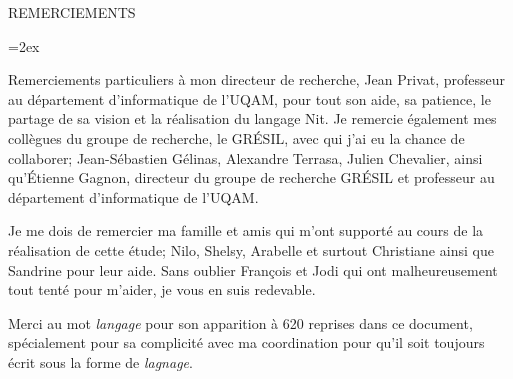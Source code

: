 
   \parskip=0pt
   \vspace*{0.1 truecm} 
   \begin{center}
    {\uppercase { REMERCIEMENTS }}\par
   \end{center}
   \nobreak \vspace*{1.10 truecm}
   \parskip=2ex

Remerciements particuliers à mon directeur de recherche, Jean Privat,  professeur au département d'informatique de l'UQAM, pour tout son aide, sa patience, le partage de sa vision et la réalisation du langage Nit. Je remercie également mes collègues du groupe de recherche, le GRÉSIL, avec qui j'ai eu la chance de collaborer; Jean-Sébastien Gélinas, Alexandre Terrasa, Julien Chevalier, ainsi qu'Étienne Gagnon, directeur du groupe de recherche GRÉSIL et professeur au département d'informatique de l'UQAM.

Je me dois de remercier ma famille et amis qui m'ont supporté au cours de la réalisation de cette étude; Nilo, Shelsy, Arabelle et surtout Christiane ainsi que Sandrine pour leur aide. Sans oublier François et Jodi qui ont malheureusement tout tenté pour m'aider, je vous en suis redevable.

Merci au mot \textit{langage} pour son apparition à 620 reprises dans ce document, spécialement pour sa complicité avec ma coordination pour qu'il soit toujours écrit sous la forme de \textit{lagnage}.
